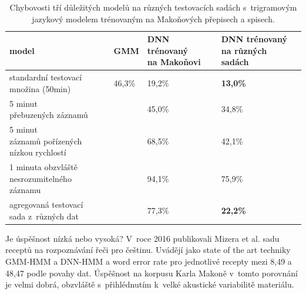\begin{table}[htpb]
\begin{center}
\begin{tabular}{|l|l|l|l|}
\hline
model & GMM & \makecell{ DNN trénovaný\\ na Makoňovi } & \makecell{ DNN trénovaný\\ na různých sadách } \\
\hline
\makecell{standardní testovací\\ množina (50min)} & 46,3\% & 19,2\% & \textbf{13,0\%} \\ \hline
\makecell{5 minut\\ přebuzených záznamů} & & 45,0\% & 34,8\% \\ \hline
\makecell{5 minut\\ záznamů pořízených\\ nízkou rychlostí } & & 68,5\% & 42,1\% \\ \hline
\makecell{1 minuta obzvláště\\ nesrozumitelného záznamu } & & 94,1\% & 75,9\% \\ \hline
\makecell{agregovaná testovací\\ sada z~různých dat} & & 77,3\% & \textbf{22,2\%} \\ \hline %
\end{tabular}
\caption{Chybovosti tří důležitých modelů na různých testovacích sadách s~trigramovým
jazykový modelem trénovaným na Makoňových přepisech a spisech.}\label{tab:asr-scores}
\end{center}
\end{table}

Je úspěšnost nízká nebo vysoká? V~roce 2016 publikovali Mizera et
al.\cite{mizera2016kaldi} sadu receptů na rozpoznávání řeči pro češtinu.
Uvádějí jako state of the art techniky GMM-HMM a DNN-HMM a word error rate pro
jednotlivé recepty mezi 8,49 a 48,47 podle povahy dat. Úspěšnost na korpusu
Karla Makoně v~tomto porovnání je velmi dobrá, obzvláště s~přihlédnutím
k~velké akustické variabilitě materiálu.

